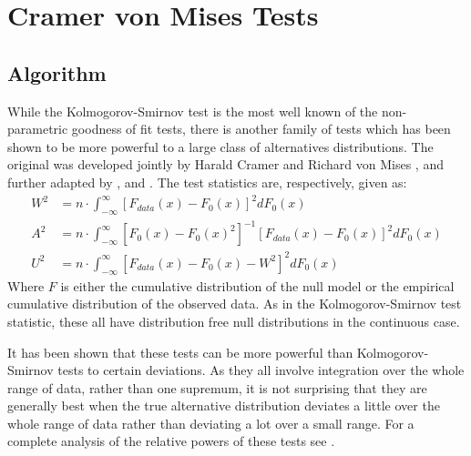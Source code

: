 \documentclass[article]{jss}
\begin{document}

\section{Cramer von Mises Tests}

\subsection{Algorithm}

While the Kolmogorov-Smirnov test is the most well known of the non-parametric goodness of fit tests, there is another family of 
tests which has been shown to be more powerful to a large class of alternatives distributions. The original was developed jointly by
Harald Cramer and Richard von Mises \citep{cramer1928, vonmises1928}, and further adapted by \cite{anderson1952}, and 
\cite{Watson1961}. The test statistics are, respectively, given as:
\begin{align*}
W^2 &= n \cdot \int_{-\infty}^{\infty} \left[ F_{data}(x)- F_{0}(x) \right]^2 dF_0(x) \\
A^2 &= n \cdot \int_{-\infty}^{\infty} \left[F_0(x) -F_0(x)^2 \right]^{-1} \left[ F_{data}(x)- F_{0}(x) \right]^2 dF_0(x) \\
U^2 &= n \cdot \int_{-\infty}^{\infty} \left[ F_{data}(x)- F_{0}(x) - W^2 \right]^2 dF_0(x)
\end{align*}
Where $F$ is either the cumulative distribution of the null model or the empirical cumulative distribution of the observed data.
As in the Kolmogorov-Smirnov test statistic, these all have distribution free null distributions in the continuous case. 

It has been shown that these tests can be more powerful than Kolmogorov-Smirnov tests to certain deviations. As they all involve
integration over the whole range of data, rather than one supremum, it is not surprising that they are generally best when the
true alternative distribution deviates a little over the whole range of data rather than deviating a lot over a small range. For
a complete analysis of the relative powers of these tests see \cite{stephens1974}.
\end{document}
